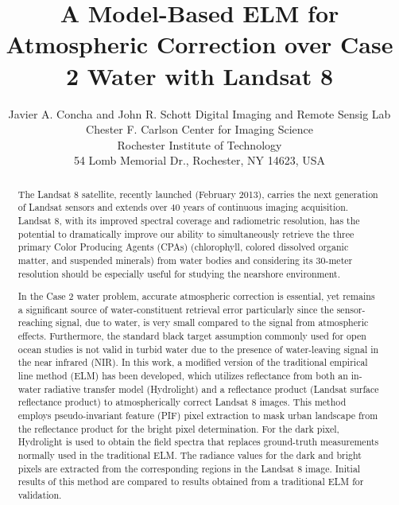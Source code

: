 \documentclass[]{spie}  %
\title{A Model-Based ELM for Atmospheric Correction over Case 2 Water with Landsat 8}
\author{Javier A. Concha and John R. Schott
\skiplinehalf
Digital Imaging and Remote Sensig Lab\\Chester F. Carlson Center for Imaging Science\\Rochester Institute of Technology\\ 54 Lomb Memorial Dr., Rochester, NY 14623, USA\\
}
\begin{document}
 
  \maketitle 

\begin{abstract}
The Landsat 8 satellite, recently launched (February 2013), carries the next generation of Landsat sensors and extends over 40 years of continuous imaging acquisition. Landsat 8, with its improved spectral coverage and radiometric resolution, has the potential to dramatically improve our ability to simultaneously retrieve the three primary Color Producing Agents (CPAs) (chlorophyll, colored dissolved organic matter, and suspended minerals) from water bodies and considering its 30-meter resolution should be especially useful for studying the nearshore environment.

In the Case 2 water problem, accurate atmospheric correction is essential, yet remains a significant source of water-constituent retrieval error particularly since the sensor-reaching signal, due to water, is very small compared to the signal from atmospheric effects. Furthermore, the standard black target assumption commonly used for open ocean studies is not valid in turbid water due to the presence of water-leaving signal in the near infrared (NIR). In this work, a modified version of the traditional empirical line method (ELM) has been developed, which utilizes reflectance from both an in-water radiative transfer model (Hydrolight) and a reflectance product (Landsat surface reflectance product) to atmospherically correct Landsat 8 images. This method employs pseudo-invariant feature (PIF) pixel extraction to mask urban landscape from the reflectance product for the bright pixel determination. For the dark pixel, Hydrolight is used to obtain the field spectra that replaces ground-truth measurements normally used in the traditional ELM. The radiance values for the dark and bright pixels are extracted from the corresponding regions in the Landsat 8 image. Initial results of this method are compared to results obtained from a traditional ELM for validation.\end{abstract}


\end{document}
